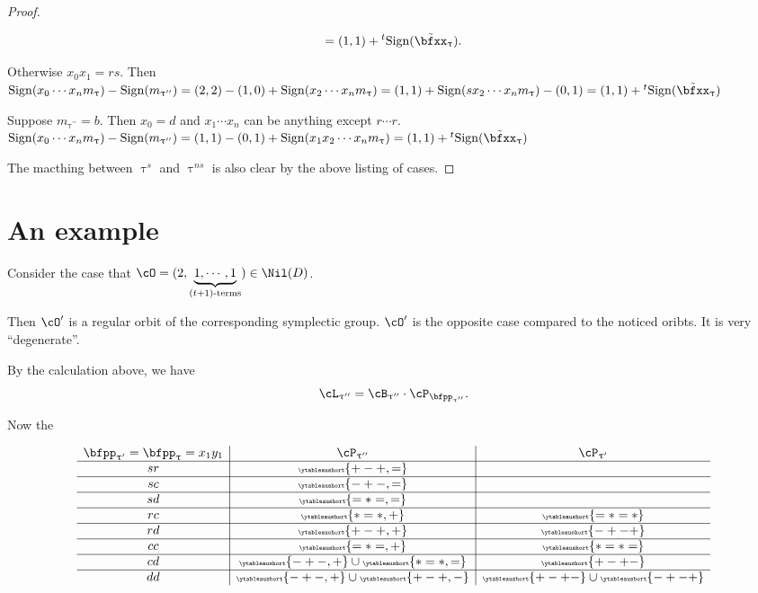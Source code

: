 \documentclass[12pt,a4paper]{amsart}
\numberwithin{equation}{section}
\theoremstyle{remark}
\def\tsign{{}^t\mathrm{Sign}}
\def\ssign{\mathrm{Sign}}
\def\tbfxx{\tilde{\bfxx}}
\let\ytb=\ytableaushort
\newcommand{\tytb}[1]{{\tiny\ytb{#1}}}
\def\cOp{\cO^{\prime}}
\def\uptaup{\uptau^{\prime}}
\def\uptaupp{\uptau^{\prime\prime}}
\begin{document}
\begin{proof}
{\begin{enumPF}
\begin{enumPF}
\[           = (1,1)+\tsign(\tbfxx_{\uptau}).\]
           \item Otherwise $x_{0}x_{1}=rs$. Then
           $\ssign(x_{0}\cdots x_{n}m_{\uptau})-\ssign(m_{\uptaupp})
           = (2,2)-(1,0)+\ssign(x_{2}\cdots x_{n}m_{\uptau})
           = (1,1)+\ssign(sx_{2}\cdots x_{n}m_{\uptau}) - (0,1) = (1,1)+\tsign(\tbfxx_{\uptau})$
         \end{enumPF}
         \item Suppose $m_{\uptaupp}= b$. Then $x_{0}=d$ and $x_{1}\cdots x_{n}$
         can be anything except $r\cdots r$.
         $\ssign(x_{0}\cdots x_{n}m_{\uptau})-\ssign(m_{\uptaupp})
         = (1,1)-(0,1)+\ssign(x_{1}x_{2}\cdots x_{n}m_{\uptau}) = (1,1)+\tsign(\tbfxx_{\uptau})$
       \end{enumPF}
       The macthing between $\uptau^{s}$ and $\uptau^{ns}$ is also clear by the
       above listing of cases.
     }
 \end{proof}



\section{An example}\label{sec:C.reg}
Consider the case that
$\cO = (2,\underbrace{1, \cdots, 1}_{(t+1)\text{-terms}})\in \Nil(D)$.

Then $\cOp$ is a regular orbit of the corresponding symplectic group. $\cOp$ is
the opposite case compared to the noticed oribts. It is very ``degenerate''.

By the calculation above, we have
\[
  \cL_{\uptaupp} = \cB_{\uptaupp} \cdot \cP_{\bfpp_{\uptaupp}}.
\]

Now the


\begin{equation} \label{eq:B1-2}
  \begin{array}{c|c|c}
   \bfpp_{\uptaup}=\bfpp_{\uptau}=x_{1}y_{1}  &   \cP_{\uptaupp} & \cP_{\uptaup}\\
    \hline
    sr & \tytb{+-+,=} & \\
    \hline
    sc & \tytb{-+-,=} & \\
    \hline
    sd & \tytb{=\ast=,=} &\\
    \hline
    rc & \tytb{\ast=\ast,+} & \tytb{=\ast=\ast}\\
    \hline
    rd & \tytb{+-+,+} & \tytb{-+-+}\\
    \hline
    cc & \tytb{=\ast=,+} &  \tytb{\ast=\ast=} \\
    \hline
    cd & \tytb{-+-,+} \cup \tytb{\ast=\ast,=} &\tytb{+-+-} \\
    \hline
    dd & \tytb{-+-,+}\cup\tytb{+-+,-} &\tytb{+-+-} \cup \tytb{-+-+}\\
  \end{array}
\end{equation}
\end{document}

